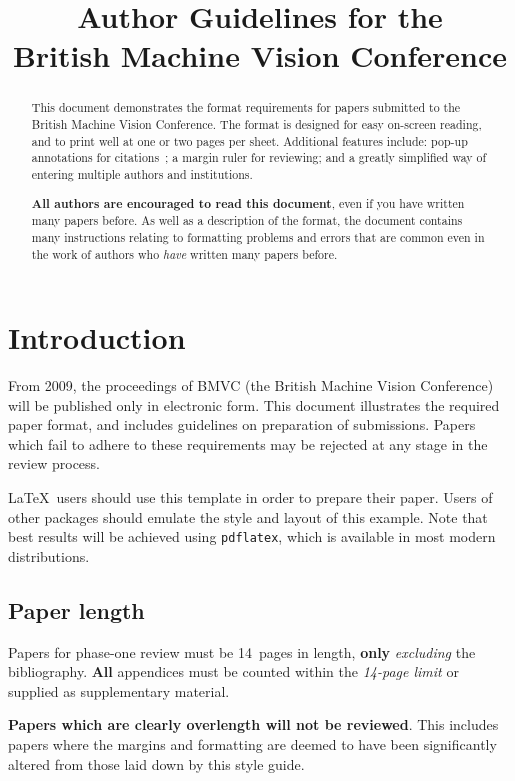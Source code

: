 \documentclass{bmvc2k}
\title{Author Guidelines for the\\ British Machine Vision Conference}
\begin{document}
\maketitle

\begin{abstract}
This document demonstrates the format requirements for papers submitted
to the British Machine Vision Conference.  The format is designed for
easy on-screen reading, and to print well at one or two pages per sheet.
Additional features include: pop-up annotations for
citations~\cite{Authors06,Mermin89}; a margin ruler for reviewing; and a
greatly simplified way of entering multiple authors and institutions.

{\bf All authors are encouraged to read this document}, even if you have
written many papers before.  As well as a description of the format, the
document contains many instructions relating to formatting problems and
errors that are common even in the work of authors who {\em have}
written many papers before.
\end{abstract}

\section{Introduction}
\label{sec:intro}
From 2009, the proceedings of BMVC (the British Machine Vision
Conference) will be published only in electronic form.  This document
illustrates the required paper format, and includes guidelines on
preparation of submissions.  Papers which fail to adhere to these
requirements may be rejected at any stage in the review process.

\LaTeX\ users should use this template in order to prepare their paper.
Users of other packages should emulate the style and layout of this
example.  Note that best results will be achieved using {\tt pdflatex},
which is available in most modern distributions.

\subsection{Paper length}
Papers for phase-one review must be 14~pages in length, {\bf only} {\em excluding} the bibliography.
{\bf All} appendices must be counted within the {\em 14-page limit} or supplied as supplementary material. 


{\bf Papers which are
clearly overlength will not be reviewed}.  This includes papers where the
margins and formatting are deemed to have been significantly altered from
those laid down by this style guide.
\end{document}
